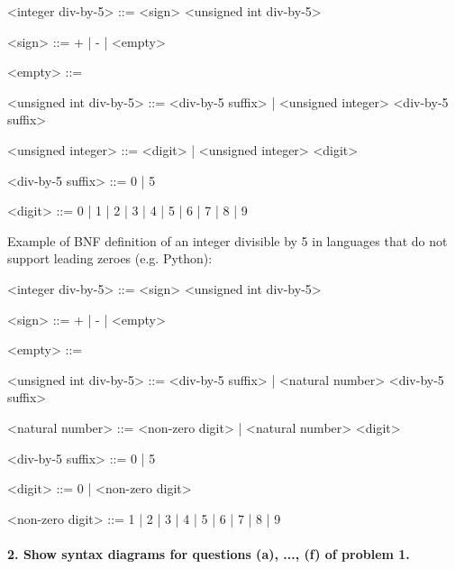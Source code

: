 \documentclass{article}
\begin{document}
	\ttfamily
	\begin{grammar}
	
		<integer div-by-5> ::= <sign> <unsigned int div-by-5>
		
		<sign> ::= + | - | <empty>
		
		<empty> ::= \
		
		<unsigned int div-by-5> ::= <div-by-5 suffix> | <unsigned integer> <div-by-5 suffix>
	
		<unsigned integer> ::= <digit> | <unsigned integer> <digit>
		
		<div-by-5 suffix> ::= 0 | 5

		<digit> ::= 0 | 1 | 2 | 3 | 4 | 5 | 6 | 7 | 8 | 9
		
	\end{grammar}
	
		\rmfamily
	
		Example of BNF definition of an integer divisible by 5 in languages that do not support leading zeroes (e.g. Python):
		
	\ttfamily
	\begin{grammar}
	
		<integer div-by-5> ::= <sign> <unsigned int div-by-5>
		
		<sign> ::= + | - | <empty>
		
		<empty> ::= \
		
		<unsigned int div-by-5> ::= <div-by-5 suffix> | <natural number> <div-by-5 suffix>
		
		<natural number> ::= <non-zero digit> | <natural number> <digit>
		
		<div-by-5 suffix> ::= 0 | 5
		
		<digit> ::= 0 | <non-zero digit>
		
		<non-zero digit> ::= 1 | 2 | 3 | 4 | 5 | 6 | 7 | 8 | 9
		
	\end{grammar}
	
	
	
	
	
	\paragraph{2. Show syntax diagrams for questions (a), ..., (f) of problem 1.}
\end{document}
